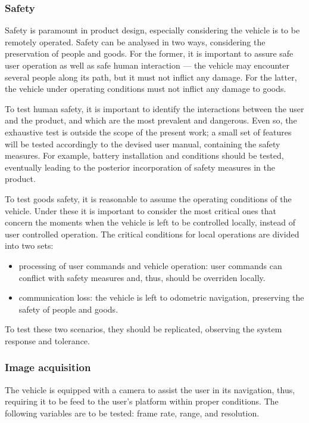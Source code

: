 \subsubsection{Safety}%
\label{sec:orgf4c025f}
Safety is paramount in product design, especially considering the vehicle is to
be remotely operated. Safety can be analysed in two ways, considering the
preservation of people and goods. For the former, it is important to assure safe
user operation as well as safe human interaction --- the vehicle may encounter
several people along its path, but it must not inflict any damage. For the
latter, the vehicle under operating conditions must not inflict any damage to
goods.

To test human safety, it is important to identify the interactions between the
user and the product, and which are the most prevalent and dangerous. Even so,
the exhaustive test is outside the scope of the present work; a small set of
features will be tested accordingly to the devised user manual, containing the
safety measures. For example, battery installation and conditions should be
tested, eventually leading to the posterior incorporation of safety measures in
the product.

To test goods safety, it is reasonable to assume the operating conditions of the
vehicle. Under these it is important to consider the most critical ones that
concern the moments when the vehicle is left to be controlled locally, instead
of user controlled operation. The critical conditions for local operations are
divided into two sets:
\begin{itemize}
\item processing of user commands and vehicle operation: user commands can
  conflict with safety measures and, thus, should be overriden locally.
\item communication loss: the vehicle is left to odometric navigation,
  preserving the safety of people and goods.
\end{itemize}
To test these two scenarios, they should be replicated, observing the system
response and tolerance.

\subsubsection{Image acquisition}%
\label{sec:orgb1f5c2a}
The vehicle is equipped with a camera to assist the user in its navigation,
thus, requiring it to be feed to the user's platform within proper conditions.
The following variables are to be tested: frame rate, range, and resolution.

